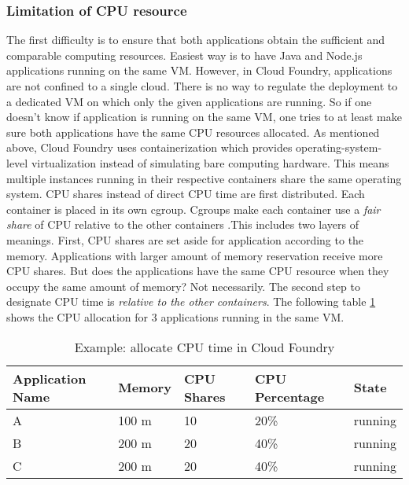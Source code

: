 \subsubsection{Limitation of CPU resource}
\label{cpu limitation}
The first difficulty is to ensure that both applications obtain the sufficient and comparable computing resources. Easiest way is to have Java and Node.js applications running on the same VM. However, in Cloud Foundry, applications are not confined to a single cloud. There is no way to regulate the deployment to a dedicated VM on which only the given applications are running. So if one doesn't know if application is running on the same VM, one tries to at least make sure both applications have the same CPU resources allocated. As mentioned above, Cloud Foundry uses containerization which provides operating-system-level virtualization instead of simulating bare computing hardware. This means multiple instances running in their respective containers share the same operating system. CPU shares instead of direct CPU time are first distributed. Each container is placed in its own cgroup. Cgroups make each container use a \textit{fair share} of CPU relative to the other containers \citep{CGroup}.This includes two layers of meanings. First, CPU shares are set aside for application according to the memory. Applications with larger amount of memory reservation receive more CPU shares. But does the applications have the same CPU resource when they occupy the same amount of memory? Not necessarily. The second step to designate CPU time is \textit{relative to the other containers}. The following table \ref{CPU time in Cloud Foundry} shows the CPU allocation for 3 applications running in the same VM. 
\begin{table}[h]
	\caption{Example: allocate CPU time in Cloud Foundry}
	\label{CPU time in Cloud Foundry}
	\renewcommand{\arraystretch}{1.2}
	\centering
	\sffamily
	\begin{footnotesize}
		\begin{tabular}{l l l l l }
			\toprule
			\textbf{Application Name} & \textbf{Memory} & \textbf{CPU Shares}& \textbf{CPU Percentage} }& \textbf{State}\\
			\midrule
		    A 	&	100	m & 10 & 20\%   & running\\
			B	&	200 m & 20 & 40\% & running\\
			C	&	200 m &	20 & 40\% & running\\
			\bottomrule
		\end{tabular}
	\end{footnotesize}
	\rmfamily
\end{table}

